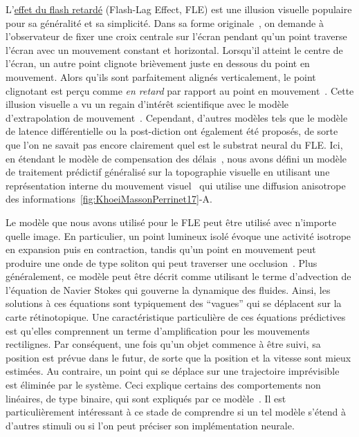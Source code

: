 \documentclass[11pt,french,a4paper,oneside]{article}%
\begin{document}
L'\href{https://en.wikipedia.org/wiki/Flash_lag_illusion}{effet
du flash retardé} (Flash-Lag Effect, FLE) est une illusion visuelle populaire pour sa généralité
et sa simplicité. Dans sa forme originale~\citep{MacKay58}, on demande à
l'observateur de fixer une croix centrale sur l'écran
pendant qu'un point traverse l'écran avec un mouvement constant et
horizontal. Lorsqu'il atteint le centre de l'écran, un autre point
clignote brièvement juste en dessous du point en mouvement. Alors qu'ils
sont parfaitement alignés verticalement, le point clignotant est perçu
comme \emph{en retard} par rapport au point en mouvement~\citep{Perrinet19temps}. Cette illusion visuelle a
vu un regain d'intérêt scientifique avec le modèle d'extrapolation de
mouvement~\citep{Nijhawan02,Nijhawan09}. Cependant, d'autres
modèles tels que le modèle de latence différentielle ou la post-diction ont
également été proposés, de sorte que l'on ne savait pas encore clairement
quel est le substrat neural du FLE. Ici, en étendant le modèle de
compensation des délais~\citep{PerrinetAdamsFriston14}, nous
avons défini un modèle de traitement prédictif généralisé sur la
topographie visuelle en utilisant une représentation interne du
mouvement visuel~\citep{Perrinet12pred} qui utilise une diffusion
anisotrope des informations~\ref{fig:KhoeiMassonPerrinet17}-A.

Le modèle que nous avons utilisé pour le FLE peut être utilisé avec
n'importe quelle image. En particulier, un point lumineux isolé évoque une
activité isotrope en expansion puis en contraction, tandis qu'un point
en mouvement peut produire une onde de type soliton qui peut traverser
une occlusion~\citep{Khoei13jpp}. Plus généralement, ce
modèle peut être décrit comme  utilisant le terme d'advection de l'équation de Navier
Stokes qui gouverne la dynamique des fluides. Ainsi,
les solutions à ces équations sont typiquement des ``vagues'' qui se
déplacent sur la carte rétinotopique. Une caractéristique particulière
de ces équations prédictives est qu'elles comprennent un terme d'amplification pour les
mouvements rectilignes. Par conséquent, une fois qu'un objet commence à
être suivi, sa position est prévue dans le futur, de sorte que la
position et la vitesse sont mieux estimées. Au contraire, un point qui
se déplace sur une trajectoire imprévisible est éliminée par le système.
Ceci explique certains des comportements non linéaires, de type
binaire, qui sont expliqués par ce modèle~\citep{Perrinet12pred}. Il est
particulièrement intéressant à ce stade de comprendre si un tel modèle
s'étend à d'autres stimuli ou si l'on peut préciser son implémentation
neurale.
\end{document}
